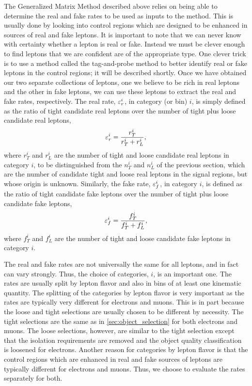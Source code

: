 The Generalized Matrix Method described above relies on being able to determine
the real and fake rates to be used as inputs to the method.
This is usually done by looking into control regions
which are designed to be enhanced in sources of real and fake leptons.
It is important to note that we can never know with certainty 
whether a lepton is real or fake. Instead we must be clever enough
to find leptons that we are confident are of the appropriate type.
One clever trick is to use a method called the tag-and-probe method
to better identify real or fake leptons in the control regions;
it will be described shortly.
Once we have obtained our two separate collections of leptons,
one we believe to be rich in real leptons and the other in fake leptons,
we can use these leptons to extract the real and fake rates, respectively.
The real rate, $\varepsilon_r^i$, in category (or bin) $i$,
is simply defined as the ratio of tight candidate real leptons
over the number of tight plus loose candidate real leptons,
\begin{equation}
\label{eq:real_rate}
\varepsilon_r^i = \frac{r_T^i}{r_T^i+r_L^i},
\end{equation}
where $r_T^i$ and $r_L^i$ are the number of tight and loose candidate
real leptons in category $i$, to be 
distinguished from the $n_T^i$ and $n_L^i$ of the previous section,
which
are the number of candidate tight and loose real leptons in the signal regions,
but whose origin is unknown.
Similarly, the fake rate, $\varepsilon_f^i$, in category $i$, 
is defined as the ratio of tight candidate fake leptons over
the number of tight plus loose candidate fake leptons,
\begin{equation}
\label{eq:fake_rate}
\varepsilon_f^i = \frac{f_T^i}{f_T^i+f_L^i},
\end{equation}
where $f_T^i$ and $f_L^i$ are the number of tight and loose candidate
fake leptons in category $i$.

The real and fake rates are not universally the same for all leptons, 
and in fact can vary strongly. Thus, the choice of categories, $i$, is
an important one. The rates are usually split by lepton
flavor and also in bins of at least one kinematic quantity.
The splitting of the categories by lepton flavor is 
very important as the rates are 
typically very different for electrons and muons. 
This is in part because
the loose and tight selections are usually chosen to be different
by necessity.
The tight selections are the same as in \sec\ref{sec:object_selection}
for both electrons and muons.  The loose selections, however,
are similar to the tight selection except that
the isolation requirements are removed and the object quality 
classification is loosened for electrons.
Another reason for categories by lepton flavor
is that the control regions which are enhanced in real and fake sources
of leptons are typically different for electrons and muons.
Thus, we choose to evaluate the rates separately for both.


